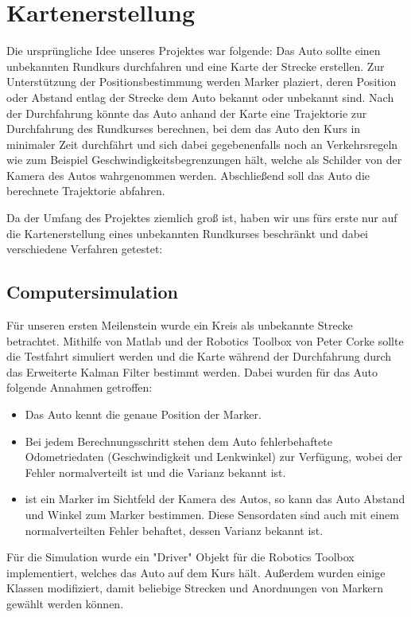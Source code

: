 \section{Kartenerstellung}

Die ursprüngliche Idee unseres Projektes war folgende: Das Auto sollte einen unbekannten Rundkurs durchfahren und eine Karte der Strecke erstellen. Zur Unterstützung der Positionsbestimmung werden Marker plaziert, deren Position oder Abstand entlag der Strecke dem Auto bekannt oder unbekannt sind.
Nach der Durchfahrung könnte das Auto anhand der Karte eine Trajektorie zur Durchfahrung des Rundkurses berechnen, bei dem das Auto den Kurs in minimaler Zeit durchfährt und sich dabei gegebenenfalls noch an Verkehrsregeln wie zum Beispiel Geschwindigkeitsbegrenzungen hält, welche als Schilder von der Kamera des Autos wahrgenommen werden.
Abschließend soll das Auto die berechnete Trajektorie abfahren.

Da der Umfang des Projektes ziemlich groß ist, haben wir uns fürs erste nur auf die Kartenerstellung eines unbekannten Rundkurses beschränkt und dabei verschiedene Verfahren getestet:

\subsection{Computersimulation}

Für unseren ersten Meilenstein wurde ein Kreis als unbekannte Strecke betrachtet. Mithilfe von Matlab und der Robotics Toolbox von Peter Corke sollte die Testfahrt simuliert werden und die Karte während der Durchfahrung durch das Erweiterte Kalman Filter bestimmt werden.
Dabei wurden für das Auto folgende Annahmen getroffen:
\begin{itemize}
 	\item Das Auto kennt die genaue Position der Marker.
 	\item Bei jedem Berechnungsschritt stehen dem Auto fehlerbehaftete Odometriedaten (Geschwindigkeit und Lenkwinkel) zur Verfügung, wobei der Fehler normalverteilt ist und die Varianz bekannt ist.
 	\item ist ein Marker im Sichtfeld der Kamera des Autos, so kann das Auto Abstand und Winkel zum Marker bestimmen. Diese Sensordaten sind auch mit einem normalverteilten Fehler behaftet, dessen Varianz bekannt ist.
\end{itemize}

Für die Simulation wurde ein "{}Driver"{} Objekt für die Robotics Toolbox implementiert, welches das Auto auf dem Kurs hält. Außerdem wurden einige Klassen modifiziert, damit beliebige Strecken und Anordnungen von Markern gewählt werden können.

